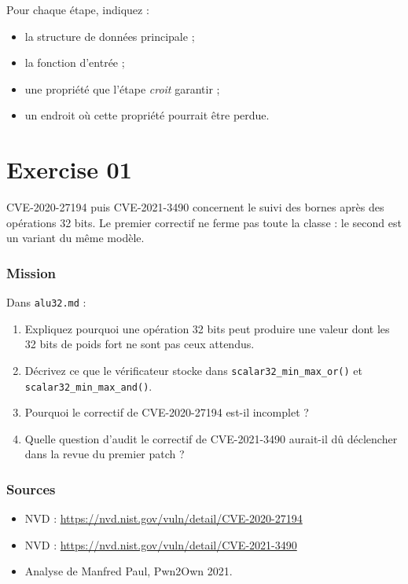 \documentclass{training}
\begin{document}
Pour chaque étape, indiquez :

\begin{itemize}
  \item la structure de données principale ;
  \item la fonction d'entrée ;
  \item une propriété que l'étape \emph{croit} garantir ;
  \item un endroit où cette propriété pourrait être perdue.
\end{itemize}


\chapter{Exercise 01}
\makeheaderfiles

CVE-2020-27194 puis CVE-2021-3490 concernent le suivi des bornes après des
opérations 32 bits. Le premier correctif ne ferme pas toute la classe : le
second est un variant du même modèle.

\subsection*{Mission}

Dans \texttt{alu32.md} :

\begin{enumerate}
  \item Expliquez pourquoi une opération 32 bits peut produire une valeur
        dont les 32 bits de poids fort ne sont pas ceux attendus.
  \item Décrivez ce que le vérificateur stocke dans
        \texttt{scalar32\_min\_max\_or()} et
        \texttt{scalar32\_min\_max\_and()}.
  \item Pourquoi le correctif de CVE-2020-27194 est-il incomplet ?
  \item Quelle question d'audit le correctif de CVE-2021-3490 aurait-il dû
        déclencher dans la revue du premier patch ?
\end{enumerate}

\subsection*{Sources}
\begin{itemize}
  \item NVD : \url{https://nvd.nist.gov/vuln/detail/CVE-2020-27194}
  \item NVD : \url{https://nvd.nist.gov/vuln/detail/CVE-2021-3490}
  \item Analyse de Manfred Paul, Pwn2Own 2021.
\end{itemize}
\end{document}
